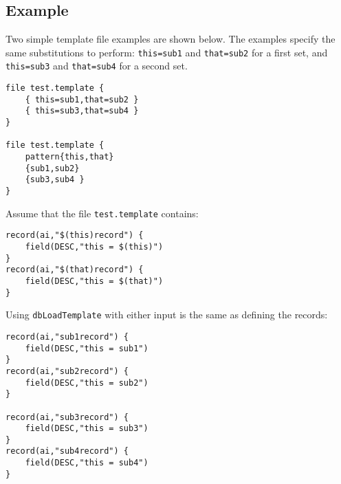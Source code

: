 \subsection{Example}

Two simple template file examples are shown below. The examples specify the same substitutions to perform: 
\verb|this=sub1| and \verb|that=sub2| for a first set, and \verb|this=sub3| and \verb|that=sub4| for a second set. 

\begin{verbatim}
file test.template {
    { this=sub1,that=sub2 }
    { this=sub3,that=sub4 }
}

file test.template {
    pattern{this,that}
    {sub1,sub2}
    {sub3,sub4 }
}
\end{verbatim}

Assume that the file \verb|test.template| contains:

\begin{verbatim}
record(ai,"$(this)record") {
    field(DESC,"this = $(this)")
}
record(ai,"$(that)record") {
    field(DESC,"this = $(that)")
}
\end{verbatim}

Using \verb|dbLoadTemplate| with either input is the same as defining the records:

\begin{verbatim}
record(ai,"sub1record") {
    field(DESC,"this = sub1")
}
record(ai,"sub2record") {
    field(DESC,"this = sub2")
}

record(ai,"sub3record") {
    field(DESC,"this = sub3")
}
record(ai,"sub4record") {
    field(DESC,"this = sub4")
}
\end{verbatim}
